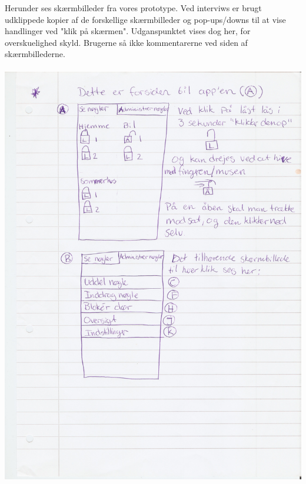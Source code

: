 \documentclass[a4paper,12pt]{article}
\begin{document}
Herunder ses skærmbilleder fra vores prototype. Ved interviws er brugt udklippede kopier af de forskellige skærmbilleder og pop-ups/downs til at vise handlinger ved "klik på skærmen". Udganspunktet vises dog her, for overskuelighed skyld. Brugerne så ikke kommentarerne ved siden af skærmbillederne.
\\ \\
\includegraphics[width=\textwidth]{proto/AB.jpg}
\end{document}

